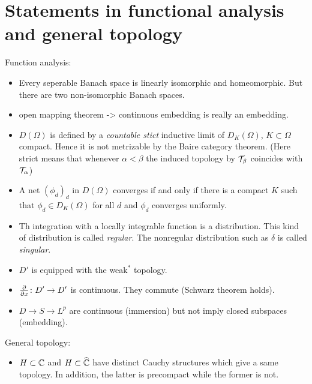 \documentclass{article}
\let\realsection\section
\renewcommand\section{\newpage\realsection}
\begin{document}
\section{Statements in functional analysis and general topology}
Function analysis:
\begin{itemize}
\item Every seperable Banach space is linearly isomorphic and homeomorphic. But there are two non-isomorphic Banach spaces.
\item open mapping theorem -> continuous embedding is really an embedding.
\item $D(\Omega)$ is defined by a \emph{countable stict} inductive limit of $D_K(\Omega)$, $K\subset\Omega$ compact. Hence it is not metrizable by the Baire category theorem. (Here strict means that whenever $\alpha<\beta$ the induced topology by $\mathcal{T}_\beta$ coincides with $\mathcal{T}_\alpha$)
\item A net $(\phi_d)_d$ in $D(\Omega)$ converges if and only if there is a compact $K$ such that $\phi_d\in D_K(\Omega)$ for all $d$ and $\phi_d$ converges uniformly.
\item Th integration with a locally integrable function is a distribution. This kind of distribution is called \emph{regular}. The nonregular distribution such as $\delta$ is called \emph{singular}.
\item $D'$ is equipped with the weak$^*$ topology.
\item $\pd{x}\colon D'\to D'$ is continuous. They commute (Schwarz theorem holds).
\item $D\to S\to L^p$ are continuous (immersion) but not imply closed subspaces (embedding).
\end{itemize}
General topology:
\begin{itemize}
\item $H\subset\mathbb{C}$ and $H\subset\widehat{\mathbb{C}}$ have distinct Cauchy structures which give a same topology. In addition, the latter is precompact while the former is not.
\end{itemize}
\end{document}
